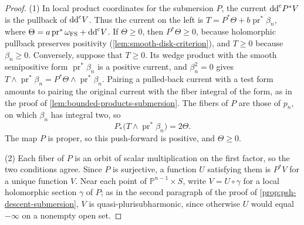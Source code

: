 \begin{proof}
(1) In local product coordinates for the submersion $P$, the current $\mathrm{dd}^{\mathrm{c}} P^*V$ is the pullback of $\mathrm{dd}^{\mathrm{c}} V$. Thus the current on the left is $T=P^*\Theta+b\operatorname{pr}^*\beta_n$, where $\Theta=a\operatorname{pr}^*\omega_{\mathrm{FS}}+\mathrm{dd}^{\mathrm{c}} V$. If $\Theta\geq0$, then $P^*\Theta\geq0$, because holomorphic pullback preserves positivity (\cref{lem:smooth-disk-criterion}), and $T\geq0$ because $\beta_n\geq0$. Conversely, suppose that $T\geq0$. Its wedge product with the smooth semipositive form $\operatorname{pr}^*\beta_n$ is a positive current, and $\beta_n^2=0$ gives $T\wedge\operatorname{pr}^*\beta_n=P^*\Theta\wedge\operatorname{pr}^*\beta_n$. Pairing a pulled-back current with a test form amounts to pairing the original current with the fiber integral of the form, as in the proof of \cref{lem:bounded-products-submersion}. The fibers of $P$ are those of $p_n$, on which $\beta_n$ has integral two, so
\[
 P_*\bigl(T\wedge\operatorname{pr}^*\beta_n\bigr)=2\Theta.
\]
The map $P$ is proper, so this push-forward is positive, and $\Theta\geq0$.

(2) Each fiber of $P$ is an orbit of scalar multiplication on the first factor, so the two conditions agree. Since $P$ is surjective, a function $U$ satisfying them is $P^*V$ for a unique function $V$. Near each point of $\mathbb P^{n-1}\times S$, write $V=U\circ\gamma$ for a local holomorphic section $\gamma$ of $P$; as in the second paragraph of the proof of \cref{prop:psh-descent-submersion}, $V$ is quasi-plurisubharmonic, since otherwise $U$ would equal $-\infty$ on a nonempty open set.


\end{proof}
